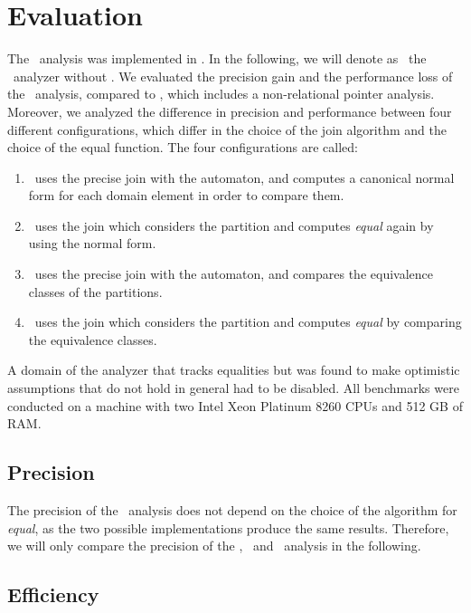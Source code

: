 \chapter{Evaluation}\label{chapter:evaluation}


The \cpo\ analysis was implemented in \goblint.
In the following, we will denote as \base\ the \goblint\ analyzer without \cpo.
We evaluated the precision gain and the performance loss of the \cpo\ analysis, compared to \base, which includes a non-relational pointer analysis.
Moreover, we analyzed the difference in precision and performance between four different
configurations, which differ in the choice of the join algorithm and the choice of the equal function.
The four configurations are called:
\begin{enumerate}
\item \cpou\ uses the precise join with the automaton, and computes a canonical normal form for each domain element in order to compare them.
\item \cpod\ uses the join which considers the partition and computes \emph{equal} again by using the normal form.
\item \cpot\ uses the precise join with the automaton, and compares the equivalence classes of the partitions.
\item \cpoq\ uses the join which considers the partition and computes \emph{equal} by comparing the equivalence classes.
\end{enumerate}
A domain of the analyzer that tracks equalities but was found to make optimistic assumptions that do not hold in general had to be disabled.
All benchmarks were conducted on a machine with two Intel Xeon Platinum 8260 CPUs and 512 GB of RAM.

\section{Precision}

The precision of the \cpo\ analysis does not depend on the choice of the algorithm for \emph{equal}, as the two possible implementations produce the same results.
Therefore, we will only compare the precision of the \cpou, \cpod\ and \base\ analysis in the following.


\section{Efficiency}


